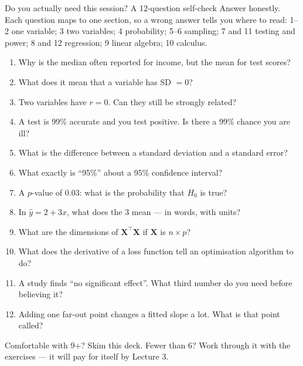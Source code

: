 \documentclass[aspectratio=169,11pt]{beamer}
\begin{document}
\begin{frame}{Do you actually need this session? A 12-question self-check}
  \scriptsize
  Answer honestly. Each question maps to one section, so a wrong answer tells
  you where to read: 1--2 one variable; 3 two variables; 4 probability;
  5--6 sampling; 7 and 11 testing and power; 8 and 12 regression;
  9 linear algebra; 10 calculus.
  \begin{enumerate}
    \item Why is the median often reported for income, but the mean for test scores?
    \item What does it mean that a variable has SD $=0$?
    \item Two variables have $r = 0$. Can they still be strongly related?
    \item A test is 99\% accurate and you test positive. Is there a 99\% chance
          you are ill?
    \item What is the difference between a standard deviation and a standard error?
    \item What exactly is ``95\%'' about a 95\% confidence interval?
    \item A $p$-value of $0.03$: what is the probability that $H_0$ is true?
    \item In $\hat y = 2 + 3x$, what does the $3$ mean --- in words, with units?
    \item What are the dimensions of $\mathbf{X}^\top\mathbf{X}$ if $\mathbf{X}$
          is $n \times p$?
    \item What does the derivative of a loss function tell an optimisation
          algorithm to do?
    \item A study finds ``no significant effect''. What third number do you
          need before believing it?
    \item Adding one far-out point changes a fitted slope a lot. What is that
          point called?
  \end{enumerate}
  \begin{takeaway}[Scoring]
    Comfortable with 9+? Skim this deck. Fewer than 6? Work through it with
    the exercises --- it will pay for itself by Lecture 3.
  \end{takeaway}
\end{frame}
\end{document}
